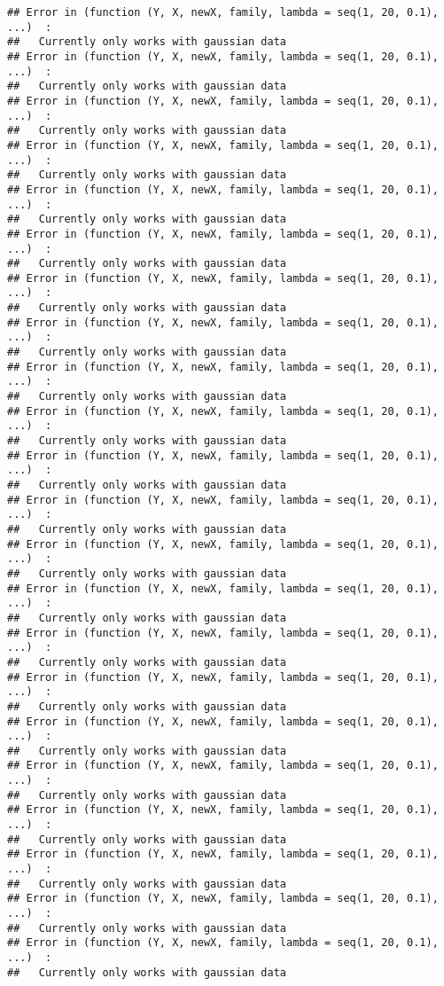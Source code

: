 \documentclass[
]{article}
\begin{document}
\begin{verbatim}
## Error in (function (Y, X, newX, family, lambda = seq(1, 20, 0.1), ...)  : 
##   Currently only works with gaussian data
## Error in (function (Y, X, newX, family, lambda = seq(1, 20, 0.1), ...)  : 
##   Currently only works with gaussian data
## Error in (function (Y, X, newX, family, lambda = seq(1, 20, 0.1), ...)  : 
##   Currently only works with gaussian data
## Error in (function (Y, X, newX, family, lambda = seq(1, 20, 0.1), ...)  : 
##   Currently only works with gaussian data
## Error in (function (Y, X, newX, family, lambda = seq(1, 20, 0.1), ...)  : 
##   Currently only works with gaussian data
## Error in (function (Y, X, newX, family, lambda = seq(1, 20, 0.1), ...)  : 
##   Currently only works with gaussian data
## Error in (function (Y, X, newX, family, lambda = seq(1, 20, 0.1), ...)  : 
##   Currently only works with gaussian data
## Error in (function (Y, X, newX, family, lambda = seq(1, 20, 0.1), ...)  : 
##   Currently only works with gaussian data
## Error in (function (Y, X, newX, family, lambda = seq(1, 20, 0.1), ...)  : 
##   Currently only works with gaussian data
## Error in (function (Y, X, newX, family, lambda = seq(1, 20, 0.1), ...)  : 
##   Currently only works with gaussian data
## Error in (function (Y, X, newX, family, lambda = seq(1, 20, 0.1), ...)  : 
##   Currently only works with gaussian data
## Error in (function (Y, X, newX, family, lambda = seq(1, 20, 0.1), ...)  : 
##   Currently only works with gaussian data
## Error in (function (Y, X, newX, family, lambda = seq(1, 20, 0.1), ...)  : 
##   Currently only works with gaussian data
## Error in (function (Y, X, newX, family, lambda = seq(1, 20, 0.1), ...)  : 
##   Currently only works with gaussian data
## Error in (function (Y, X, newX, family, lambda = seq(1, 20, 0.1), ...)  : 
##   Currently only works with gaussian data
## Error in (function (Y, X, newX, family, lambda = seq(1, 20, 0.1), ...)  : 
##   Currently only works with gaussian data
## Error in (function (Y, X, newX, family, lambda = seq(1, 20, 0.1), ...)  : 
##   Currently only works with gaussian data
## Error in (function (Y, X, newX, family, lambda = seq(1, 20, 0.1), ...)  : 
##   Currently only works with gaussian data
## Error in (function (Y, X, newX, family, lambda = seq(1, 20, 0.1), ...)  : 
##   Currently only works with gaussian data
## Error in (function (Y, X, newX, family, lambda = seq(1, 20, 0.1), ...)  : 
##   Currently only works with gaussian data
## Error in (function (Y, X, newX, family, lambda = seq(1, 20, 0.1), ...)  : 
##   Currently only works with gaussian data
## Error in (function (Y, X, newX, family, lambda = seq(1, 20, 0.1), ...)  : 
##   Currently only works with gaussian data
\end{verbatim}
\end{document}
